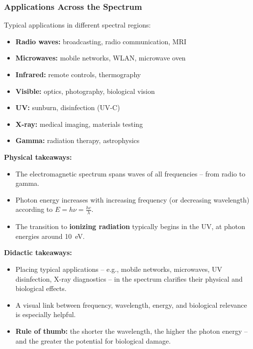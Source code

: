 \subsubsection{Applications Across the Spectrum}

Typical applications in different spectral regions:
\begin{itemize}
	\item \textbf{Radio waves:} broadcasting, radio communication, MRI
	\item \textbf{Microwaves:} mobile networks, WLAN, microwave oven
	\item \textbf{Infrared:} remote controls, thermography
	\item \textbf{Visible:} optics, photography, biological vision
	\item \textbf{UV:} sunburn, disinfection (UV-C)
	\item \textbf{X-ray:} medical imaging, materials testing
	\item \textbf{Gamma:} radiation therapy, astrophysics
\end{itemize}

\begin{tcolorbox}[hinweisbox,title=Takeaways on the Electromagnetic Spectrum]
	\label{box:Fazit zum elektro}
	\textbf{Physical takeaways:}
	\begin{itemize}
		\item The electromagnetic spectrum spans waves of all frequencies – from radio to gamma.
		\item Photon energy increases with increasing frequency (or decreasing wavelength) according to \(E = h \nu = \tfrac{hc}{\lambda}\).
		\item The transition to \textbf{ionizing radiation} typically begins in the UV, at photon energies around \SI{10}{\electronvolt}.
	\end{itemize}
	\vspace{0.5em}
	\textbf{Didactic takeaways:}
	\begin{itemize}
		\item Placing typical applications – e.g., mobile networks, microwaves, UV disinfection, X-ray diagnostics – in the spectrum clarifies their physical and biological effects.
		\item A visual link between frequency, wavelength, energy, and biological relevance is especially helpful.
		\item \textbf{Rule of thumb:} the shorter the wavelength, the higher the photon energy – and the greater the potential for biological damage.
	\end{itemize}
\end{tcolorbox}
\newpage
\noindent

